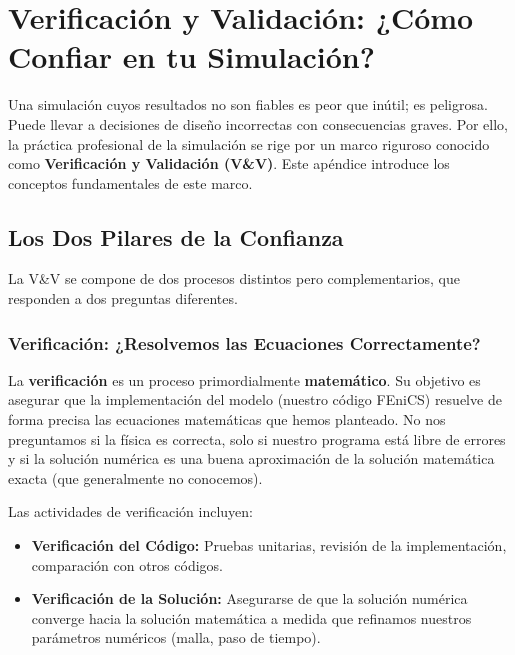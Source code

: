\chapter{Verificación y Validación: ¿Cómo Confiar en tu Simulación?}
\label{app:vv}

Una simulación cuyos resultados no son fiables es peor que inútil; es peligrosa. Puede llevar a decisiones de diseño incorrectas con consecuencias graves. Por ello, la práctica profesional de la simulación se rige por un marco riguroso conocido como \textbf{Verificación y Validación (V\&V)}. Este apéndice introduce los conceptos fundamentales de este marco.

\section{Los Dos Pilares de la Confianza}
La V\&V se compone de dos procesos distintos pero complementarios, que responden a dos preguntas diferentes.

\subsection{Verificación: ¿Resolvemos las Ecuaciones Correctamente?}
La \textbf{verificación} es un proceso primordialmente \textbf{matemático}. Su objetivo es asegurar que la implementación del modelo (nuestro código FEniCS) resuelve de forma precisa las ecuaciones matemáticas que hemos planteado. No nos preguntamos si la física es correcta, solo si nuestro programa está libre de errores y si la solución numérica es una buena aproximación de la solución matemática exacta (que generalmente no conocemos).

Las actividades de verificación incluyen:
\begin{itemize}
    \item \textbf{Verificación del Código:} Pruebas unitarias, revisión de la implementación, comparación con otros códigos.
    \item \textbf{Verificación de la Solución:} Asegurarse de que la solución numérica converge hacia la solución matemática a medida que refinamos nuestros parámetros numéricos (malla, paso de tiempo).
\end{itemize}

